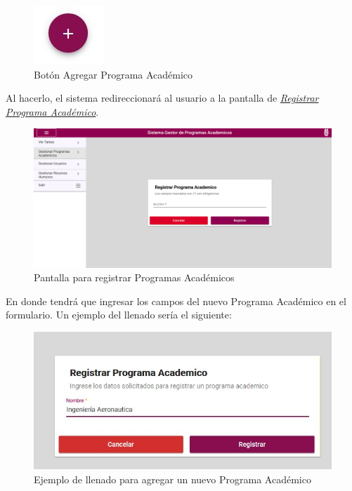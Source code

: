             \begin{figure}[H]
                \centering
                \hypertarget{add}{\includegraphics[width=0.7\linewidth]{images/SP3/BtnAgregar}}
                \caption{Botón Agregar Programa Académico}
                \label{add}
            \end{figure}

            Al hacerlo, el sistema redireccionará al usuario a la pantalla de \hyperlink{registrarpa}{\textit{Registrar Programa Académico}}.

        \begin{figure}[H]
            \centering
            \hypertarget{registrarpa}{\includegraphics[width=0.7\linewidth]{images/SP3/RegistrarPA}}
            \caption{Pantalla para registrar Programas Académicos}
            \label{registrarpa}
        \end{figure}

        En donde tendrá que ingresar los campos del nuevo Programa Académico en el formulario. Un ejemplo del llenado sería el siguiente:

        \begin{figure}[H]
            \centering
            \hypertarget{ejreg}{\includegraphics[width=0.7\linewidth]{images/SP3/Llenado}}
            \caption{Ejemplo de llenado para agregar un nuevo Programa Académico}
            \label{ejreg}
        \end{figure}

